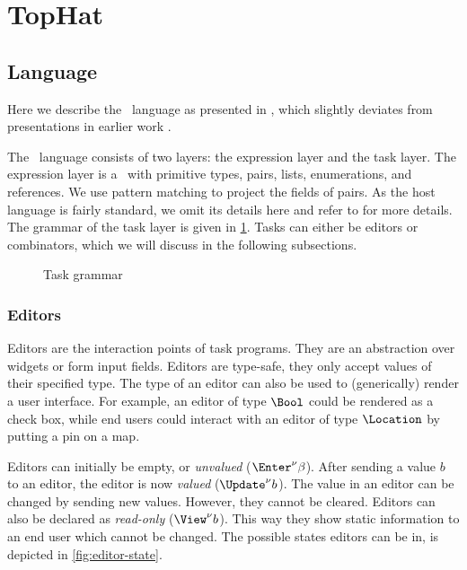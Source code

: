 
\section{TopHat}
\label{sec:tophat}

\subsection{Language}

Here we describe the \TOPHAT\ language as presented in \citet{Steenvoorden22},
which slightly deviates from presentations in earlier work \cite{conf/ppdp/SteenvoordenNK19,conf/ifl/NausSK19,conf/sfp/NausS20}.

The \TOPHAT\ language consists of two layers: the expression layer and the task layer.
The expression layer is a \STLC\ with primitive types, pairs, lists, enumerations, and references.
We use pattern matching to project the fields of pairs.
As the host language is fairly standard, we omit its details here
and refer to \citet{Steenvoorden22} for more details.
The grammar of the task layer is given in \cref{fig:task-grammar}.
Tasks can either be editors or combinators,
which we will discuss in the following subsections.

\begin{figure}
  \caption{Task grammar}
  \label{fig:task-grammar}
\end{figure}

\subsubsection{Editors}

Editors are the interaction points of task programs.
They are an abstraction over widgets or form input fields.
Editors are type-safe,
they only accept values of their specified type.
The type of an editor can also be used to (generically) render a user interface.
For example,
an editor of type $\Bool$ could be rendered as a check box,
while end users could interact with an editor of type $\Location$ by putting a pin on a map.

Editors can initially be empty, or \emph{unvalued} ($\Enter^\nu \beta$).
After sending a value $b$ to an editor, the editor is now \emph{valued} ($\Update^\nu b$).
The value in an editor can be changed by sending new values.
However, they cannot be cleared.
Editors can also be declared as \emph{read-only} ($\View^\nu b$).
This way they show static information to an end user which cannot be changed.
The possible states editors can be in, is depicted in \cref{fig:editor-state}.

